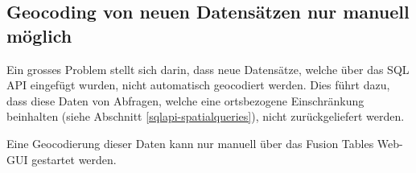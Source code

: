 \subsection{Geocoding von neuen Datensätzen nur manuell möglich}
\label{geocodierung-bug}
Ein grosses Problem stellt sich darin, dass neue Datensätze, welche über das SQL \gls{API} eingefügt wurden, nicht automatisch geocodiert werden. Dies führt dazu, dass diese Daten von Abfragen, welche eine ortsbezogene Einschränkung beinhalten (siehe Abschnitt \ref{sqlapi-spatialqueries}), nicht zurückgeliefert werden.

Eine \gls{Geocodierung} dieser Daten kann nur manuell über das Fusion Tables Web-GUI gestartet werden.
